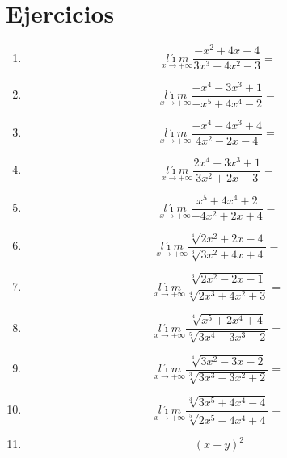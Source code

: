 \documentclass[oneside,spanish,letter]{article}
\begin{document}
\section{Ejercicios}
\begin{enumerate}
 \item $$\underset{x\rightarrow +\infty}{l\acute{\imath}m} \frac{-x^2+4x-4}{3x^3-4x^2-3}=$$
 \item $$\underset{x\rightarrow +\infty}{l\acute{\imath}m} \frac{-x^4-3x^3+1}{-x^5+4x^4-2}=$$
 \item $$\underset{x\rightarrow +\infty}{l\acute{\imath}m} \frac{-x^4-4x^3+4}{4x^2-2x-4}=$$
 \item $$\underset{x\rightarrow +\infty}{l\acute{\imath}m} \frac{2x^4+3x^3+1}{3x^2+2x-3}=$$
 \item $$\underset{x\rightarrow +\infty}{l\acute{\imath}m} \frac{x^5+4x^4+2}{-4x^2+2x+4}=$$
 \item $$\underset{x\rightarrow +\infty}{l\acute{\imath}m} \frac{\sqrt[4]{2x^2+2x-4}}{\sqrt[3]{3x^2+4x+4}}=$$
 \item $$\underset{x\rightarrow +\infty}{l\acute{\imath}m} \frac{\sqrt[3]{2x^2-2x-1}}{\sqrt[4]{2x^3+4x^2+3}}=$$
 \item $$\underset{x\rightarrow +\infty}{l\acute{\imath}m} \frac{\sqrt[4]{x^5+2x^4+4}}{\sqrt[5]{3x^4-3x^3-2}}=$$
 \item $$\underset{x\rightarrow +\infty}{l\acute{\imath}m} \frac{\sqrt[4]{3x^2-3x-2}}{\sqrt[3]{3x^3-3x^2+2}}=$$
 \item $$\underset{x\rightarrow +\infty}{l\acute{\imath}m} \frac{\sqrt[3]{3x^5+4x^4-4}}{\sqrt[5]{2x^5-4x^4+4}}=$$
\item $$(x+y)^2$$
 \end{enumerate}
  \newpage
\end{document}
